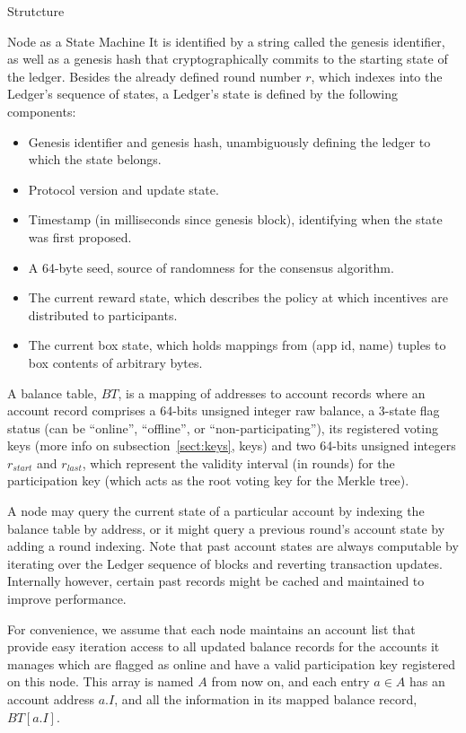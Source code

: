 \documentclass[10pt,a4paper]{article}
\begin{document}
\begin{section}{Strutcture}
\begin{subsection}{Node as a State Machine}
It is identified by a string called the genesis identifier, as well as a genesis hash that cryptographically 
commits to the starting state of the ledger.
Besides the already defined round number $r$, which indexes into the Ledger's sequence of states,
a Ledger's state is defined by the following components:
\begin{itemize}
    \item Genesis identifier and genesis hash, unambiguously defining the ledger 
    to which the state belongs.
    \item Protocol version and update state.
    \item Timestamp (in milliseconds since genesis block), identifying when the state was first proposed.
    \item A 64-byte seed, source of randomness for the consensus algorithm.
    \item The current reward state, which describes the policy at which incentives
    are distributed to participants.
    \item The current box state, which holds mappings from (app id, name) tuples
    to box contents of arbitrary bytes.
\end{itemize}

A {\sf balance table}, $BT$, is a mapping of addresses to 
account records where an {\sf account record} comprises 
 a 64-bits unsigned integer raw balance, 
 a 3-state flag status (can be ``online'', ``offline'', or ``non-participating''),
 its registered voting keys (more info on subsection~\ref{sect:keys}, keys) and 
 two 64-bits unsigned integers $r_{start}$ and $r_{last}$, which represent the 
   validity interval (in rounds)
   for the participation key (which acts as the root voting key for the Merkle 
   tree).

A node may query the current state of a particular account by indexing the balance 
table by address, or it might query a previous round's account state by adding a 
round indexing. 
Note that past account states are always computable by iterating over the Ledger
sequence of blocks and reverting transaction updates. Internally however, certain
past records might be cached and maintained to improve performance.

For convenience, we assume that each node maintains an account list that provide 
easy iteration access to all updated balance records for the accounts it manages 
which are flagged as online and have a valid participation key registered on this
node. 
This array is named $A$ from now on, and each entry $a\in A$ has an account address 
$a.I$, and all the information in its mapped balance record, $BT[a.I]$.


\end{subsection}
\end{section}
\end{document}
